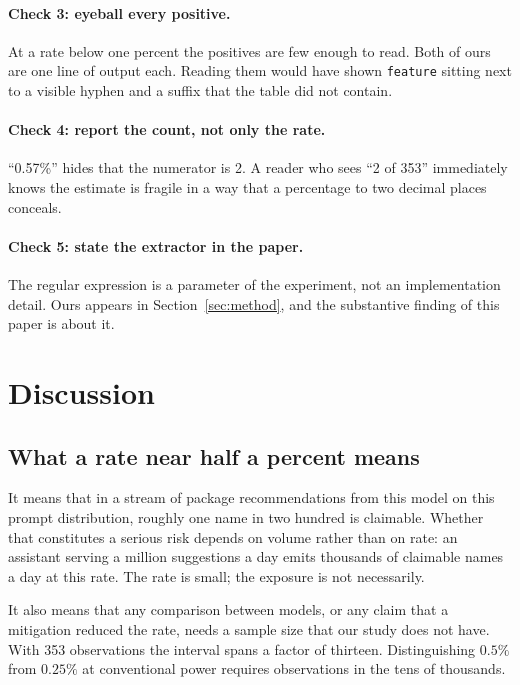 \documentclass[journal]{IEEEtran}
\theoremstyle{definition}
\newcommand{\Npkg}{353}
\newcommand{\Nhall}{2}
\newcommand{\Rate}{0.57}
\begin{document}
\paragraph{Check 3: eyeball every positive.}
At a rate below one percent the positives are few enough to read. Both of ours
are one line of output each. Reading them would have shown
\texttt{feature} sitting next to a visible hyphen and a suffix that the table
did not contain.

\paragraph{Check 4: report the count, not only the rate.}
``\Rate\%'' hides that the numerator is \Nhall{}. A reader who sees
``\Nhall{} of \Npkg{}'' immediately knows the estimate is fragile in a way that
a percentage to two decimal places conceals.

\paragraph{Check 5: state the extractor in the paper.}
The regular expression is a parameter of the experiment, not an implementation
detail. Ours appears in Section~\ref{sec:method}, and the substantive finding of
this paper is about it.

\section{Discussion}
\label{sec:discussion}

\subsection{What a rate near half a percent means}

It means that in a stream of package recommendations from this model on this
prompt distribution, roughly one name in two hundred is claimable. Whether that
constitutes a serious risk depends on volume rather than on rate: an assistant
serving a million suggestions a day emits thousands of claimable names a day at
this rate. The rate is small; the exposure is not necessarily.

It also means that any comparison between models, or any claim that a
mitigation reduced the rate, needs a sample size that our study does not have.
With \Npkg{} observations the interval spans a factor of thirteen. Distinguishing
$0.5\%$ from $0.25\%$ at conventional power requires observations in the tens of
thousands.
\end{document}
